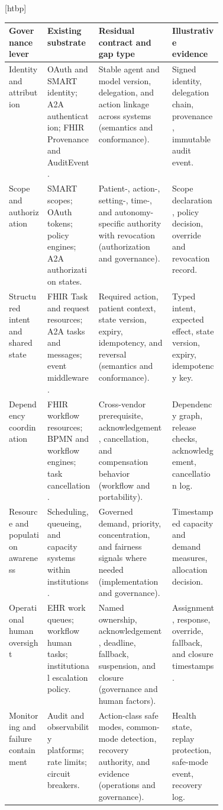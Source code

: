 \documentclass[10pt]{article}
\makeatletter
\renewenvironment{table}[1][tbp]{\@dblfloat{table}[#1]}{\end@dblfloat}
\makeatother
\begin{document}
\begin{table}[htbp]
\centering
\caption{Lever-level crosswalk from existing infrastructure to residual coordination contracts.}
\label{tab:levers}
\footnotesize
\begin{tabularx}{\linewidth}{B{0.18\linewidth}p{0.24\linewidth}YY}
\toprule
Governance lever & Existing substrate & Residual contract and gap type & Illustrative evidence \\
\midrule
Identity and attribution & OAuth and SMART identity; A2A authentication; FHIR Provenance and
AuditEvent. & Stable agent and model version, delegation, and action linkage across systems
(semantics and conformance). & Signed identity, delegation chain, provenance, immutable audit event. \\
Scope and authorization & SMART scopes; OAuth tokens; policy engines; A2A authorization states. &
Patient-, action-, setting-, time-, and autonomy-specific authority with revocation
(authorization and governance). & Scope declaration, policy decision, override and revocation record. \\
Structured intent and shared state & FHIR Task and request resources; A2A tasks and messages; event
middleware. & Required action, patient context, state version, expiry, idempotency, and reversal
(semantics and conformance). & Typed intent, expected effect, state version, expiry, idempotency key. \\
Dependency coordination & FHIR workflow resources; BPMN and workflow engines; task cancellation. &
Cross-vendor prerequisite, acknowledgement, cancellation, and compensation behavior
(workflow and portability). & Dependency graph, release checks, acknowledgement, cancellation log. \\
Resource and population awareness & Scheduling, queueing, and capacity systems within institutions. &
Governed demand, priority, concentration, and fairness signals where needed
(implementation and governance). & Timestamped capacity and demand measures, allocation decision. \\
Operational human oversight & EHR work queues; workflow human tasks; institutional escalation policy. &
Named ownership, acknowledgement, deadline, fallback, suspension, and closure
(governance and human factors). & Assignment, response, override, fallback, and closure timestamps. \\
Monitoring and failure containment & Audit and observability platforms; rate limits; circuit breakers. &
Action-class safe modes, common-mode detection, recovery authority, and evidence
(operations and governance). & Health state, replay protection, safe-mode event, recovery log. \\
\bottomrule
\end{tabularx}
\end{table}
\end{document}
